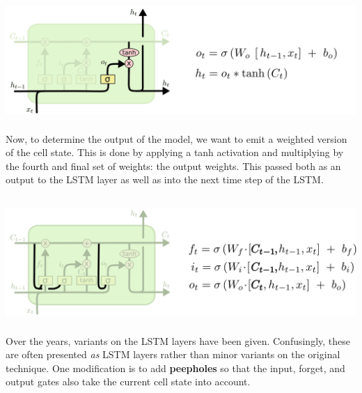 \documentclass[xetex,mathserif,serif,aspectratio=169]{beamer}
\begin{document}
\begin{frame}[fragile] \frametitle{} \oldB \small

\begin{center}
\includegraphics[height=4.5cm]{img/cloah12.png}
\end{center}

Now, to determine the output of the model, we want to
emit a weighted version of the cell state. This is done
by applying a tanh activation and multiplying by the
fourth and final set of weights: the output weights.
This passed both as an output to the LSTM layer as well
as into the next time step of the LSTM.

\end{frame}

\begin{frame}[fragile] \frametitle{} \oldB \small


\end{frame}

\begin{frame}[fragile] \frametitle{} \oldB \small

\begin{center}
\includegraphics[height=4.5cm]{img/cloah13.png}
\end{center}

Over the years, variants on the LSTM layers have been given.
Confusingly, these are often presented \textit{as} LSTM layers
rather than minor variants on the original technique. One
modification is to add \textbf{peepholes} so that the input,
forget, and output gates also take the current cell state
into account.

\end{frame}
\end{document}
